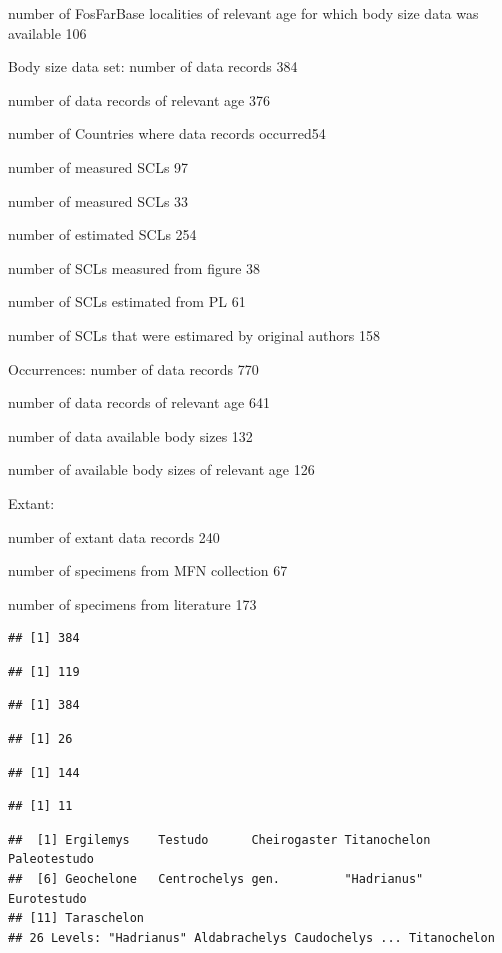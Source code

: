 \documentclass[]{article}
\begin{document}
number of FosFarBase localities of relevant age for which body size data
was available 106

Body size data set: number of data records 384

number of data records of relevant age 376

number of Countries where data records occurred54

number of measured SCLs 97

number of measured SCLs 33

number of estimated SCLs 254

number of SCLs measured from figure 38

number of SCLs estimated from PL 61

number of SCLs that were estimared by original authors 158

Occurrences: number of data records 770

number of data records of relevant age 641

number of data available body sizes 132

number of available body sizes of relevant age 126

Extant:

number of extant data records 240

number of specimens from MFN collection 67

number of specimens from literature 173

\begin{verbatim}
## [1] 384
\end{verbatim}

\begin{verbatim}
## [1] 119
\end{verbatim}

\begin{verbatim}
## [1] 384
\end{verbatim}

\begin{verbatim}
## [1] 26
\end{verbatim}

\begin{verbatim}
## [1] 144
\end{verbatim}

\begin{verbatim}
## [1] 11
\end{verbatim}

\begin{verbatim}
##  [1] Ergilemys    Testudo      Cheirogaster Titanochelon Paleotestudo
##  [6] Geochelone   Centrochelys gen.         "Hadrianus"  Eurotestudo 
## [11] Taraschelon 
## 26 Levels: "Hadrianus" Aldabrachelys Caudochelys ... Titanochelon
\end{verbatim}
\end{document}
